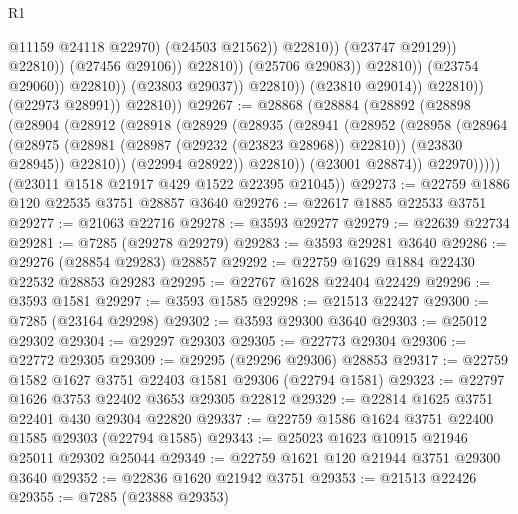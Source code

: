 \begin{lexlean}{R1}
\begin{coremodule}
                                                      @11159
                                                      @24118
                                                      @22970)
                                                    (@24503 @21562))
                                                  @22810))
                                              (@23747 @29129))
                                            @22810))
                                        (@27456 @29106))
                                      @22810))
                                  (@25706 @29083))
                                @22810))
                            (@23754 @29060))
                          @22810))
                      (@23803 @29037))
                    @22810))
                (@23810 @29014))
              @22810))
          (@22973 @28991))
        @22810))
@29267 := @28868
    (@28884
      (@28892
        (@28898
          (@28904
            (@28912
              (@28918
                (@28929
                  (@28935
                    (@28941
                      (@28952
                        (@28958
                          (@28964
                            (@28975
                              (@28981 (@28987 (@29232 (@23823 @28968)) @22810))
                              (@23830 @28945))
                            @22810))
                        (@22994 @28922))
                      @22810))
                  (@23001 @28874))
                @22970)))))
      (@23011 @1518 @21917 @429 @1522 @22395 @21045))
@29273 := @22759 @1886 @120 @22535 @3751 @28857 @3640
@29276 := @22617 @1885 @22533 @3751
@29277 := @21063 @22716
@29278 := @3593 @29277
@29279 := @22639 @22734
@29281 := @7285 (@29278 @29279)
@29283 := @3593 @29281 @3640
@29286 := @29276 (@28854 @29283) @28857
@29292 := @22759 @1629 @1884 @22430 @22532 @28853 @29283
@29295 := @22767 @1628 @22404 @22429
@29296 := @3593 @1581
@29297 := @3593 @1585
@29298 := @21513 @22427
@29300 := @7285 (@23164 @29298)
@29302 := @3593 @29300 @3640
@29303 := @25012 @29302
@29304 := @29297 @29303
@29305 := @22773 @29304
@29306 := @22772 @29305
@29309 := @29295 (@29296 @29306) @28853
@29317 := @22759 @1582 @1627 @3751 @22403 @1581 @29306 (@22794 @1581)
@29323 := @22797 @1626 @3753 @22402 @3653 @29305 @22812
@29329 := @22814 @1625 @3751 @22401 @430 @29304 @22820
@29337 := @22759 @1586 @1624 @3751 @22400 @1585 @29303 (@22794 @1585)
@29343 := @25023 @1623 @10915 @21946 @25011 @29302 @25044
@29349 := @22759 @1621 @120 @21944 @3751 @29300 @3640
@29352 := @22836 @1620 @21942 @3751
@29353 := @21513 @22426
@29355 := @7285 (@23888 @29353)

\end{coremodule}
\end{lexlean}
